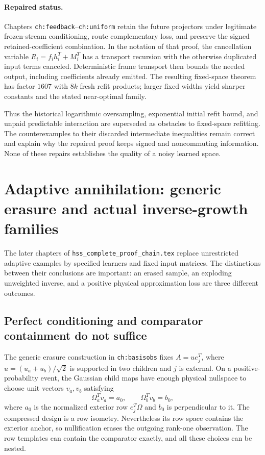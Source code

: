 \documentclass[11pt,oneside,openany,a4paper]{report}
\numberwithin{equation}{chapter}
\theoremstyle{definition}
\theoremstyle{remark}
\newcommand{\sourcefile}[1]{{\small\nolinkurl{#1}}}
\begin{document}
\paragraph{Repaired status.}
Chapters \texttt{ch:feedback}--\texttt{ch:uniform} retain the future
projectors under legitimate frozen-stream conditioning, route
complementary loss, and preserve the signed retained-coefficient
combination.  In the notation of that proof, the cancellation
variable $R_i=f_ih_i^T+M_i^T$ has a transport recursion with the
otherwise duplicated input terms canceled.  Deterministic frame
transport then bounds the needed output, including coefficients
already emitted.  The resulting fixed-space theorem has factor
$1607$ with $8k$ fresh refit products; larger fixed widths yield
sharper constants and the stated near-optimal family.

Thus the historical logarithmic oversampling, exponential initial
refit bound, and unpaid predictable interaction are superseded as
obstacles to fixed-space refitting.  The counterexamples to their
discarded intermediate inequalities remain correct and explain why
the repaired proof keeps signed and noncommuting information.
None of these repairs establishes the quality of a noisy learned
space.

\section{Adaptive annihilation: generic erasure and actual inverse-growth families}
\label{origobs:actual-inverses}

The later chapters of \sourcefile{hss_complete_proof_chain.tex}
replace unrestricted adaptive examples by specified learners and fixed
input matrices.  The distinctions between their conclusions are
important: an erased sample, an exploding unweighted inverse, and a
positive physical approximation loss are three different outcomes.

\subsection{Perfect conditioning and comparator containment do not suffice}

The generic erasure construction in \texttt{ch:basisobs} fixes
$A=ue_j^T$, where $u=(u_a+u_b)/\sqrt2$ is supported in two children
and $j$ is external.  On a positive-probability event, the Gaussian
child maps have enough physical nullspace to choose unit vectors
$v_a,v_b$ satisfying
\[
 \Omega_a^Tv_a=a_0,\qquad \Omega_b^Tv_b=b_0,
\]
where $a_0$ is the normalized exterior row $e_j^T\Omega$ and $b_0$
is perpendicular to it.  The compressed design is a row isometry.
Nevertheless its row space contains the exterior anchor, so
nullification erases the outgoing rank-one observation.  The row
templates can contain the comparator exactly, and all these choices
can be nested.
\end{document}
